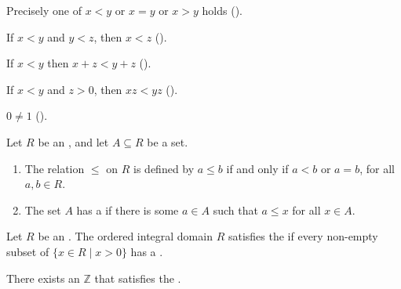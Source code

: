 \begin{definition}
\begin{lenumerate}
		      Precisely one of $x < y$ or $x = y$ or $x > y$ holds \quad ().
		\item {}
		      If $x < y$ and $y < z$, then $x < z$ \quad ().
		\item {}
		      If $x < y$ then $x + z < y + z$ \quad ().
		\item {}
		      If $x < y$ and $z > 0$, then $x z < y z$ \quad ().
		\item {}
		      $0 \neq 1$ \quad ().
	\end{lenumerate}
\end{definition}

\begin{definition} %
	Let $R$ be an , and let $A \subseteq R$ be a set.
	\begin{enumerate}
		\item The relation $\leq$ on $R$ is defined by $a \leq b$ if and only if $a < b$ or $a = b$, for all $a, b \in R$.
		\item {}
		      The set $A$ has a \emph{} if there is some $a \in A$ such that $a \leq x$ for all $x \in A$.
	\end{enumerate}
\end{definition}

\begin{definition} %
	Let $R$ be an . The ordered integral domain $R$ satisfies the \emph{} if every non-empty subset of $\{x \in R \mid x > 0 \}$
	has a .
\end{definition}

\begin{axiom}  %
	There exists an  $\mathbb{Z}$ that satisfies the .
\end{axiom}


